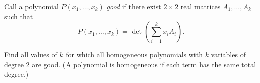 Call a polynomial \( P(x_{1}, \ldots, x_{k})\) \textit{good} if there exist \( 2\times 2\) real matrices \( A_{1}, \ldots, A_{k}\) such that
\[P(x_{1}, \ldots, x_{k}) = \det \left(\sum_{i=1}^{k}x_{i}A_{i}\right).\]

Find all values of \( k\) for which all homogeneous polynomials with \( k\) variables of degree 2 are good. (A polynomial is homogeneous if each term has the same total degree.)
